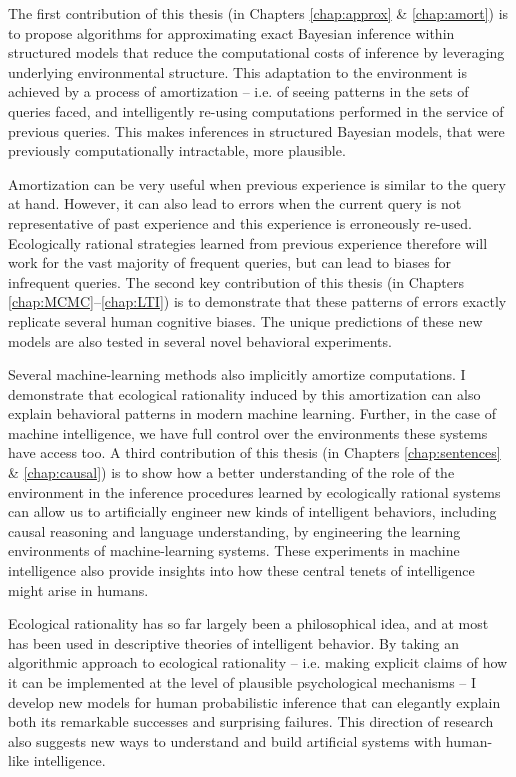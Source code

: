 The first contribution of this thesis (in Chapters \ref{chap:approx} \& \ref{chap:amort}) is to propose algorithms for approximating exact Bayesian inference within structured models that reduce the computational costs of inference by leveraging underlying environmental structure. This adaptation to the environment is achieved by a process of amortization -- i.e. of seeing patterns in the sets of queries faced, and intelligently re-using computations performed in the service of previous queries. This makes inferences in structured Bayesian models, that were previously computationally intractable, more plausible.

Amortization can be very useful when previous experience is similar to the query at hand. However, it can also lead to errors when the current query is not representative of past experience and this experience is erroneously re-used. Ecologically rational strategies learned from previous experience therefore will work for the vast majority of frequent queries, but can lead to biases for infrequent queries. The second key contribution of this thesis (in Chapters \ref{chap:MCMC}--\ref{chap:LTI}) is to demonstrate that these patterns of errors exactly replicate several human cognitive biases. The unique predictions of these new models are also tested in several novel behavioral experiments.

Several machine-learning methods also implicitly amortize computations. I demonstrate that ecological rationality induced by this amortization can also explain behavioral patterns in modern machine learning. Further, in the case of machine intelligence, we have full control over the environments these systems have access too. A third contribution of this thesis (in Chapters \ref{chap:sentences} \& \ref{chap:causal}) is to show how a better understanding of the role of the environment in the inference procedures learned by ecologically rational systems can allow us to artificially engineer new kinds of intelligent behaviors, including causal reasoning and language understanding, by engineering the learning environments of machine-learning systems. These experiments in machine intelligence also provide insights into how these central tenets of intelligence might arise in humans.


Ecological rationality has so far largely been a philosophical idea, and at most has been used in descriptive theories of intelligent behavior. By taking an algorithmic approach to ecological rationality -- i.e. making explicit claims of how it can be implemented at the level of plausible psychological mechanisms -- I develop new models for human probabilistic inference that can elegantly explain both its remarkable successes and surprising failures. This direction of research also suggests new ways to understand and build artificial systems with human-like intelligence.

